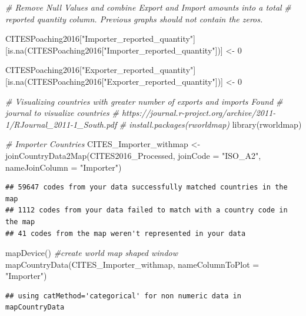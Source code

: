 \documentclass[
  12pt,
]{article}
\newenvironment{Shaded}{\begin{snugshade}}{\end{snugshade}}
\newcommand{\AttributeTok}[1]{\textcolor[rgb]{0.77,0.63,0.00}{#1}}
\newcommand{\CommentTok}[1]{\textcolor[rgb]{0.56,0.35,0.01}{\textit{#1}}}
\newcommand{\DecValTok}[1]{\textcolor[rgb]{0.00,0.00,0.81}{#1}}
\newcommand{\FunctionTok}[1]{\textcolor[rgb]{0.00,0.00,0.00}{#1}}
\newcommand{\NormalTok}[1]{#1}
\newcommand{\OtherTok}[1]{\textcolor[rgb]{0.56,0.35,0.01}{#1}}
\newcommand{\StringTok}[1]{\textcolor[rgb]{0.31,0.60,0.02}{#1}}
\begin{document}
\begin{Shaded}
\begin{Highlighting}[]
\CommentTok{\# Remove Null Values and combine Export and Import amounts into a total}
\CommentTok{\# reported quantity column. Previous graphs should not contain the zeros.}

\NormalTok{CITESPoaching2016[}\StringTok{"Importer\_reported\_quantity"}\NormalTok{][}\FunctionTok{is.na}\NormalTok{(CITESPoaching2016[}\StringTok{"Importer\_reported\_quantity"}\NormalTok{])] }\OtherTok{\textless{}{-}} \DecValTok{0}

\NormalTok{CITESPoaching2016[}\StringTok{"Exporter\_reported\_quantity"}\NormalTok{][}\FunctionTok{is.na}\NormalTok{(CITESPoaching2016[}\StringTok{"Exporter\_reported\_quantity"}\NormalTok{])] }\OtherTok{\textless{}{-}} \DecValTok{0}


\CommentTok{\# Visualizing countries with greater number of exports and imports Found}
\CommentTok{\# journal to visualize countries}
\CommentTok{\# https://journal.r{-}project.org/archive/2011{-}1/RJournal\_2011{-}1\_South.pdf}
\CommentTok{\# install.packages(\textquotesingle{}rworldmap\textquotesingle{})}
\FunctionTok{library}\NormalTok{(rworldmap)}

\CommentTok{\# Importer Countries}
\NormalTok{CITES\_Importer\_withmap }\OtherTok{\textless{}{-}} \FunctionTok{joinCountryData2Map}\NormalTok{(CITES2016\_Processed, }\AttributeTok{joinCode =} \StringTok{"ISO\_A2"}\NormalTok{,}
    \AttributeTok{nameJoinColumn =} \StringTok{"Importer"}\NormalTok{)}
\end{Highlighting}
\end{Shaded}

\begin{verbatim}
## 59647 codes from your data successfully matched countries in the map
## 1112 codes from your data failed to match with a country code in the map
## 41 codes from the map weren't represented in your data
\end{verbatim}

\begin{Shaded}
\begin{Highlighting}[]
\FunctionTok{mapDevice}\NormalTok{()  }\CommentTok{\#create world map shaped window}
\FunctionTok{mapCountryData}\NormalTok{(CITES\_Importer\_withmap, }\AttributeTok{nameColumnToPlot =} \StringTok{"Importer"}\NormalTok{)}
\end{Highlighting}
\end{Shaded}

\begin{verbatim}
## using catMethod='categorical' for non numeric data in mapCountryData
\end{verbatim}
\end{document}

